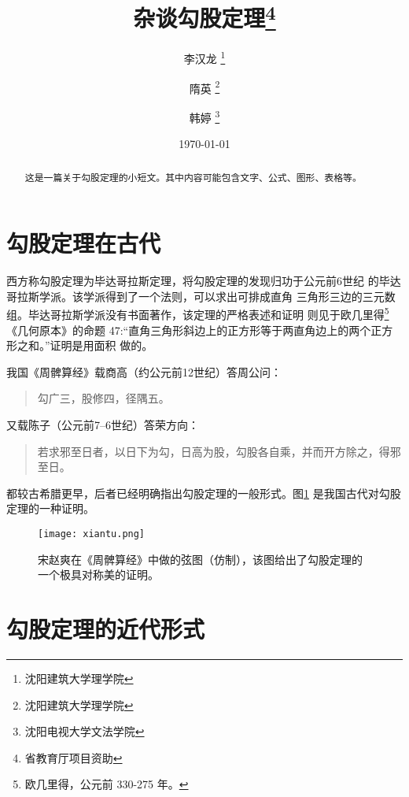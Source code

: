 \documentclass[UTF8]{ctexart}
\newenvironment{myquote}{\begin{quote}\kaishu\zihao{-5}}{\end{quote}}
\begin{document}
\pagestyle{plain}
\title{\heiti 杂谈勾股定理\thanks{省教育厅项目资助}} %
\author{\kaishu 李汉龙 \thanks {沈阳建筑大学理学院}
\and \kaishu 隋英 \thanks {沈阳建筑大学理学院}
\and \kaishu 韩婷  \thanks{沈阳电视大学文法学院}}
\date{\today} %
\maketitle %
\listoftables %
\begin{abstract}
    这是一篇关于勾股定理的小短文。其中内容可能包含文字、公式、图形、表格等。
\end{abstract}

\tableofcontents %

\section{勾股定理在古代}  
\label{sec:ancient}
西方称勾股定理为毕达哥拉斯定理，将勾股定理的发现归功于公元前6世纪
的毕达哥拉斯学派\cite{Kline}。该学派得到了一个法则，可以求出可排成直角
三角形三边的三元数组。毕达哥拉斯学派没有书面著作，该定理的严格表述和证明
则见于欧几里得\footnote{欧几里得，公元前 330-275 年。}《几何原本》的命题 
47:“直角三角形斜边上的正方形等于两直角边上的两个正方形之和。”证明是用面积
做的。\par    %

我国《周髀算经》载商高（约公元前12世纪）答周公问：
\begin{myquote}  
勾广三，股修四，径隅五。
\end{myquote}

又载陈子（公元前7--6世纪）答荣方向：
\begin{myquote}
若求邪至日者，以日下为勾，日高为股，勾股各自乘，并而开方除之，得邪至日。
\end{myquote}  

都较古希腊更早，后者已经明确指出勾股定理的一般形式。图\ref{fig:xiantu} 是我国古代对勾股定理的一种证明\cite{quanjing}。


\begin{figure}[H]%
    \centering
    \texttt{[image: xiantu.png]} %
    \caption{\kaishu 宋赵爽在《周髀算经》中做的弦图（仿制），该图给出了勾股定理的一个极具对称美的证明。\label{fig:xiantu}}
\end{figure}

\section{勾股定理的近代形式}
\end{document}
